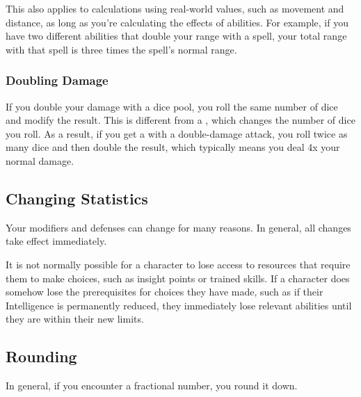         This also applies to calculations using real-world values, such as movement and distance, as long as you're calculating the effects of abilities.
        For example, if you have two different abilities that double your range with a spell, your total range with that spell is three times the spell's normal range.

        \subsubsection{Doubling Damage}
            If you double your damage with a dice pool, you roll the same number of dice and modify the result.
            This is different from a , which changes the number of dice you roll.
            As a result, if you get a  with a double-damage attack, you roll twice as many dice and then double the result, which typically means you deal 4x your normal damage.

    \subsection{Changing Statistics}

        Your modifiers and defenses can change for many reasons.
        In general, all changes take effect immediately.

        It is not normally possible for a character to lose access to resources that require them to make choices, such as insight points or trained skills.
        If a character does somehow lose the prerequisites for choices they have made, such as if their Intelligence is permanently reduced, they immediately lose relevant abilities until they are within their new limits.

    \subsection{Rounding}
        In general, if you encounter a fractional number, you round it down.
